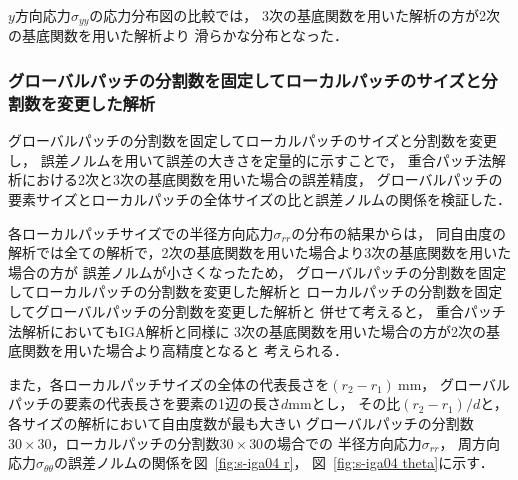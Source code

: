 $y$方向応力$\sigma_{yy}$の応力分布図の比較では，
3次の基底関数を用いた解析の方が2次の基底関数を用いた解析より
滑らかな分布となった．

\subsubsection{グローバルパッチの分割数を固定してローカルパッチのサイズと分割数を変更した解析}
グローバルパッチの分割数を固定してローカルパッチのサイズと分割数を変更し，
誤差ノルムを用いて誤差の大きさを定量的に示すことで，
重合パッチ法解析における2次と3次の基底関数を用いた場合の誤差精度，
グローバルパッチの要素サイズとローカルパッチの全体サイズの比と誤差ノルムの関係を検証した．

各ローカルパッチサイズでの半径方向応力$\sigma_{rr}$の分布の結果からは，
同自由度の解析では全ての解析で，2次の基底関数を用いた場合より3次の基底関数を用いた場合の方が
誤差ノルムが小さくなったため，
グローバルパッチの分割数を固定してローカルパッチの分割数を変更した解析と
ローカルパッチの分割数を固定してグローバルパッチの分割数を変更した解析と
併せて考えると，
重合パッチ法解析においてもIGA解析と同様に
3次の基底関数を用いた場合の方が2次の基底関数を用いた場合より高精度となると
考えられる．

\newpage

また，各ローカルパッチサイズの全体の代表長さを$(r_2 - r_1)\ $mm，
グローバルパッチの要素の代表長さを要素の1辺の長さ$d$mmとし，
その比$(r_2 - r_1)/d$と，
各サイズの解析において自由度数が最も大きい
グローバルパッチの分割数$30\times30$，ローカルパッチの分割数$30\times30$の場合での
半径方向応力$\sigma_{rr}$，
周方向応力$\sigma_{\theta\theta}$の誤差ノルムの関係を図~\ref{fig:s-iga04 r}，
図~\ref{fig:s-iga04 theta}に示す．

